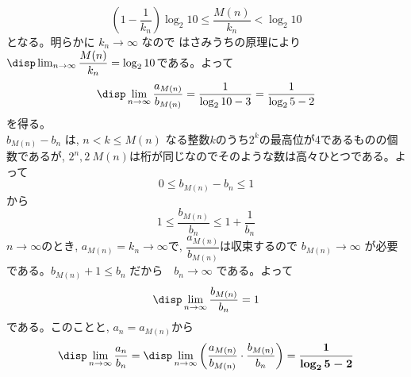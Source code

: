 \[\left(1- \dfrac{1}{k_n}\right)\log_2{10}\leq \dfrac{M(n)}{k_n} < \log_2{10} \]
となる。明らかに $k_n\to \infty$ なので はさみうちの原理により$\disp\lim_{n\to \infty} \dfrac{M(n)}{k_n}=\log_2{10}$である。よって
\[\disp\lim_{n\to \infty}\dfrac{a_{M(n)}}{b_{M(n)}}=\dfrac{1}{\log_2{10}-3}=\dfrac{1}{\log_2{5}-2}\]
を得る。\\
$b_{M(n)}-b_n$ は, $ n< k\leq M(n)$ なる整数$k$のうち$2^k$の最高位が4であるものの個数であるが, $2^n, 2~{M(n)}$は桁が同じなのでそのような数は高々ひとつである。よって
\[0\leq b_{M(n)}-b_n\leq 1\]
から
\[1\leq \dfrac{b_{M(n)}}{b_{n}}\leq 1+\dfrac{1}{b_n}\]
$n\to \infty$のとき, $a_{M(n)}=k_n\to \infty$で, $\dfrac{a_{M(n)}}{b_{M(n)}}$は収束するので $b_{M(n)}\to \infty$ が必要である。$b_{M(n)}+1\leq b_n$ だから　$b_n\to \infty$ である。よって
\[\disp\lim_{n\to \infty} \dfrac{b_{M(n)}}{b_n}=1\]
である。このことと, $a_n=a_{M(n)}$から
\[\disp\lim_{n\to \infty}\dfrac{a_n}{b_n}=\disp\lim_{n\to \infty} \left(\dfrac{a_{M(n)}}{b_{M(n)}}\cdot \dfrac{b_{M(n)}}{b_n}\right) = \mbox{{\boldmath $\dfrac{1}{\log_2{5}-2}$}}\]
